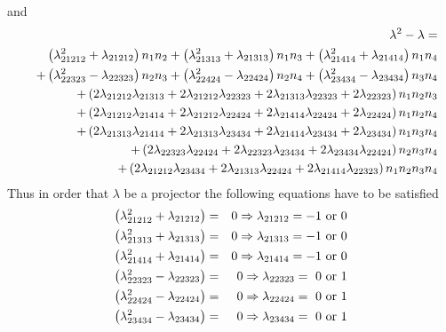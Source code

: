 \documentclass[12pt]{article}
\begin{document}
and 
\begin{eqnarray}
&&\lambda ^{2}-\lambda =  \notag \\
&&\left( \lambda _{21212}^{2}+\lambda _{21212}\right) n_{1}n_{2}+\left(
\lambda _{21313}^{2}+\lambda _{21313}\right) n_{1}n_{3}+\left( \lambda
_{21414}^{2}+\lambda _{21414}\right) n_{1}n_{4}  \notag \\
&&+\left( \lambda _{22323}^{2}-\lambda _{22323}\right) n_{2}n_{3}+\left(
\lambda _{22424}^{2}-\lambda _{22424}\right) n_{2}n_{4}+\left( \lambda
_{23434}^{2}-\lambda _{23434}\right) n_{3}n_{4}  \notag \\
&&+\left( 2\lambda _{21212}\lambda _{21313}+2\lambda _{21212}\lambda
_{22323}+2\lambda _{21313}\lambda _{22323}+2\lambda _{22323}\right)
n_{1}n_{2}n_{3}  \notag \\
&&+\left( 2\lambda _{21212}\lambda _{21414}+2\lambda _{21212}\lambda
_{22424}+2\lambda _{21414}\lambda _{22424}+2\lambda _{22424}\right)
n_{1}n_{2}n_{4}  \notag \\
&&+\left( 2\lambda _{21313}\lambda _{21414}+2\lambda _{21313}\lambda
_{23434}+2\lambda _{21414}\lambda _{23434}+2\lambda _{23434}\right)
n_{1}n_{3}n_{4}  \notag \\
&&+\left( 2\lambda _{22323}\lambda _{22424}+2\lambda _{22323}\lambda
_{23434}+2\lambda _{23434}\lambda _{22424}\right) n_{2}n_{3}n_{4}  \notag \\
&&+\left( 2\lambda _{21212}\lambda _{23434}+2\lambda _{21313}\lambda
_{22424}+2\lambda _{21414}\lambda _{22323}\right) n_{1}n_{2}n_{3}n_{4}
\end{eqnarray}%
Thus in order that $\lambda $ be a projector the following equations have to
be satisfied%
\begin{eqnarray}
\left( \lambda _{21212}^{2}+\lambda _{21212}\right) &=&0\Rightarrow \lambda
_{21212}=-1\text{ or }0  \notag \\
\left( \lambda _{21313}^{2}+\lambda _{21313}\right) &=&0\Rightarrow \lambda
_{21313}=-1\text{ or }0  \notag \\
\left( \lambda _{21414}^{2}+\lambda _{21414}\right) &=&0\Rightarrow \lambda
_{21414}=-1\text{ or }0  \notag \\
\left( \lambda _{22323}^{2}-\lambda _{22323}\right) &=&0\Rightarrow \lambda
_{22323}=\text{ }0\text{ or }1  \notag \\
\left( \lambda _{22424}^{2}-\lambda _{22424}\right) &=&0\Rightarrow \lambda
_{22424}=\text{ }0\text{ or }1  \notag \\
\left( \lambda _{23434}^{2}-\lambda _{23434}\right) &=&0\Rightarrow \lambda
_{23434}=\text{ }0\text{ or }1
\end{eqnarray}%
\end{document}
